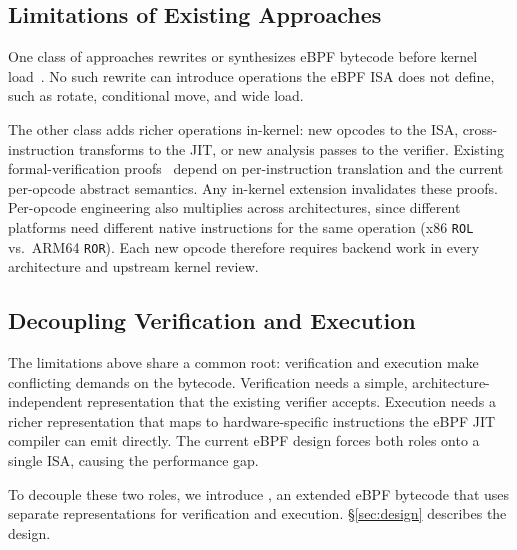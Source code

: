 

\subsection{Limitations of Existing Approaches}
\label{subsec:approaches}

One class of approaches rewrites or synthesizes eBPF bytecode before kernel load~\cite{xu2021synthesizing,mao2024merlin,zhu2025epso}. No such rewrite can introduce operations the eBPF ISA does not define, such as rotate, conditional move, and wide load.

The other class adds richer operations in-kernel: new opcodes to the ISA, cross-instruction transforms to the JIT, or new analysis passes to the verifier. Existing formal-verification proofs~\cite{nelson2020specification} depend on per-instruction translation and the current per-opcode abstract semantics. Any in-kernel extension invalidates these proofs. Per-opcode engineering also multiplies across architectures, since different platforms need different native instructions for the same operation (x86 \texttt{ROL} vs.\ ARM64 \texttt{ROR}). Each new opcode therefore requires backend work in every architecture and upstream kernel review.

\subsection{Decoupling Verification and Execution}
\label{subsec:insight}

The limitations above share a common root: verification and execution make conflicting demands on the bytecode. Verification needs a simple, architecture-independent representation that the existing verifier accepts. Execution needs a richer representation that maps to hardware-specific instructions the eBPF JIT compiler can emit directly. The current eBPF design forces both roles onto a single ISA, causing the performance gap.

To decouple these two roles, we introduce \lang, an extended eBPF bytecode that uses separate representations for verification and execution. \S\ref{sec:design} describes the design.

